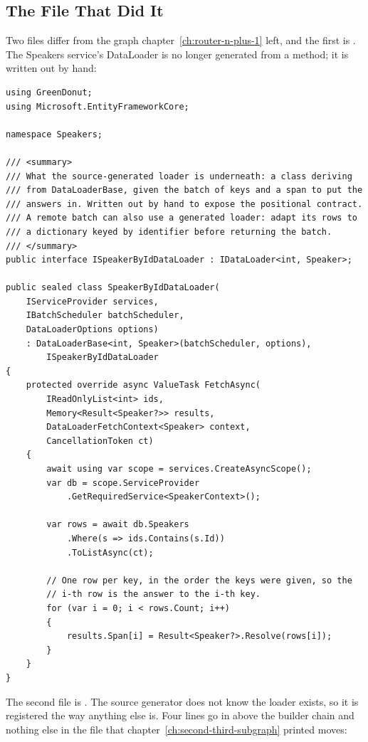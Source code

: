 \subsection{The File That Did It}

%
Two files differ from the graph chapter~\ref{ch:router-n-plus-1} left, and the
first is . The Speakers service's DataLoader is no
longer generated from a \code{[DataLoader]} method; it is written out by hand:

\begin{verbatim}
using GreenDonut;
using Microsoft.EntityFrameworkCore;

namespace Speakers;

/// <summary>
/// What the source-generated loader is underneath: a class deriving
/// from DataLoaderBase, given the batch of keys and a span to put the
/// answers in. Written out by hand to expose the positional contract.
/// A remote batch can also use a generated loader: adapt its rows to
/// a dictionary keyed by identifier before returning the batch.
/// </summary>
public interface ISpeakerByIdDataLoader : IDataLoader<int, Speaker>;

public sealed class SpeakerByIdDataLoader(
    IServiceProvider services,
    IBatchScheduler batchScheduler,
    DataLoaderOptions options)
    : DataLoaderBase<int, Speaker>(batchScheduler, options),
        ISpeakerByIdDataLoader
{
    protected override async ValueTask FetchAsync(
        IReadOnlyList<int> ids,
        Memory<Result<Speaker?>> results,
        DataLoaderFetchContext<Speaker> context,
        CancellationToken ct)
    {
        await using var scope = services.CreateAsyncScope();
        var db = scope.ServiceProvider
            .GetRequiredService<SpeakerContext>();

        var rows = await db.Speakers
            .Where(s => ids.Contains(s.Id))
            .ToListAsync(ct);

        // One row per key, in the order the keys were given, so the
        // i-th row is the answer to the i-th key.
        for (var i = 0; i < rows.Count; i++)
        {
            results.Span[i] = Result<Speaker?>.Resolve(rows[i]);
        }
    }
}
\end{verbatim}

%
The second file is . The source generator does not know the
loader exists, so it is registered the way anything else is. Four lines go in
above the builder chain and nothing else in the file that
chapter~\ref{ch:second-third-subgraph} printed moves:

